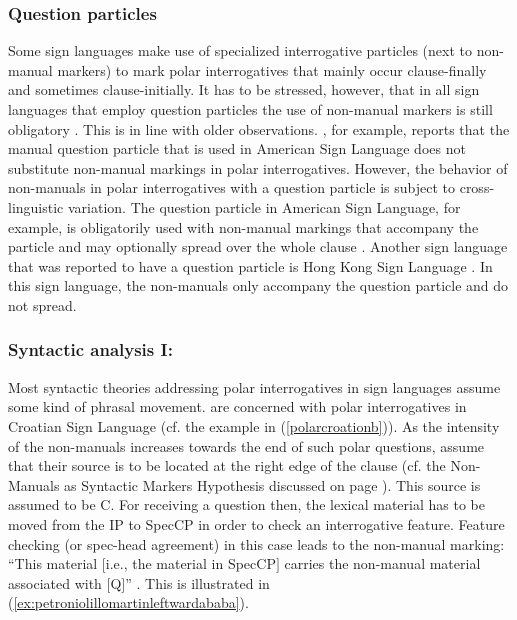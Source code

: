 \subsubsection{Question particles}
Some sign languages make use of specialized interrogative particles (next to non-manual markers) to mark polar interrogatives that mainly occur clause-finally and sometimes clause-initially. It has to be stressed, however, that in all sign languages that employ question particles the use of non-manual markers is still obligatory \citep[21]{zeshan2004interrogative}. This is in line with older observations. \citet{liddell1977non}, for example, reports that the manual question particle that is used in American Sign Language does not substitute non-manual markings in polar interrogatives. However, the behavior of non-manuals in polar interrogatives with a question particle is subject to cross-linguistic variation. The question particle in American Sign Language, for example, is obligatorily used with non-manual markings that accompany the particle and may optionally spread over the  whole clause \citep[122--124]{neidle2000syntax}. Another sign language that was reported to have a question particle is Hong Kong Sign Language \citep[206]{tang2006questions}. In this sign language, the non-manuals only accompany the question particle and do not spread.

\subsubsection{Syntactic analysis I: \citet{sarac2006interrogative}}
Most syntactic theories addressing polar interrogatives in sign languages assume some kind of phrasal movement. \citet{sarac2006interrogative} are concerned with polar interrogatives in Croatian Sign Language (cf. the example in (\ref{polarcroationb})).
As the intensity of the non-manuals increases towards the end of such polar questions, \citet{sarac2006interrogative} assume that their source is to be located at the right edge of the clause (cf. the Non-Manuals as Syntactic Markers Hypothesis discussed on page \pageref{nmasmh}). This source is assumed to be C\textdegree . For receiving a question then, the lexical material has to be moved from the IP to SpecCP in order to check an interrogative feature. Feature checking (or spec-head agreement) in this case leads to the non-manual marking: ``This material $[$i.e., the material in SpecCP$]$ carries the non-manual material associated with $[$Q$]$'' \citep[222]{sarac2006interrogative}. This is illustrated in (\ref{ex:petroniolillomartinleftwardababa}).



